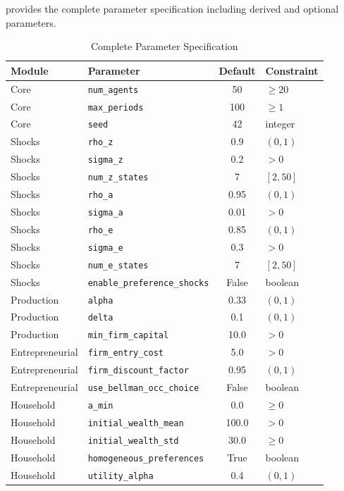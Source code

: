 \documentclass[12pt]{article}
\begin{document}
 provides the complete parameter specification including derived and optional parameters.

\begin{table}[tp]
\centering
\caption{Complete Parameter Specification}\label{tab:full_params}
\small
\begin{tabular}{@{}llcl@{}}
\toprule
\textbf{Module} & \textbf{Parameter} & \textbf{Default} & \textbf{Constraint} \\
\midrule
Core & \texttt{num\_agents} & 50 & $\geq 20$ \\
Core & \texttt{max\_periods} & 100 & $\geq 1$ \\
Core & \texttt{seed} & 42 & integer \\
\midrule
Shocks & \texttt{rho\_z} & 0.9 & $(0, 1)$ \\
Shocks & \texttt{sigma\_z} & 0.2 & $> 0$ \\
Shocks & \texttt{num\_z\_states} & 7 & $[2, 50]$ \\
Shocks & \texttt{rho\_a} & 0.95 & $(0, 1)$ \\
Shocks & \texttt{sigma\_a} & 0.01 & $> 0$ \\
Shocks & \texttt{rho\_e} & 0.85 & $(0, 1)$ \\
Shocks & \texttt{sigma\_e} & 0.3 & $> 0$ \\
Shocks & \texttt{num\_e\_states} & 7 & $[2, 50]$ \\
Shocks & \texttt{enable\_preference\_shocks} & False & boolean \\
\midrule
Production & \texttt{alpha} & 0.33 & $(0, 1)$ \\
Production & \texttt{delta} & 0.1 & $(0, 1)$ \\
Production & \texttt{min\_firm\_capital} & 10.0 & $> 0$ \\
\midrule
Entrepreneurial & \texttt{firm\_entry\_cost} & 5.0 & $> 0$ \\
Entrepreneurial & \texttt{firm\_discount\_factor} & 0.95 & $(0, 1)$ \\
Entrepreneurial & \texttt{use\_bellman\_occ\_choice} & False & boolean \\
\midrule
Household & \texttt{a\_min} & 0.0 & $\geq 0$ \\
Household & \texttt{initial\_wealth\_mean} & 100.0 & $> 0$ \\
Household & \texttt{initial\_wealth\_std} & 30.0 & $\geq 0$ \\
Household & \texttt{homogeneous\_preferences} & True & boolean \\
Household & \texttt{utility\_alpha} & 0.4 & $(0, 1)$ \\

\end{tabular}
\end{table}
\end{document}
